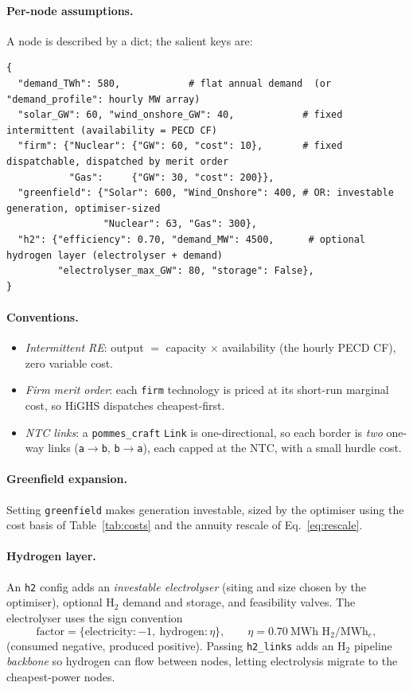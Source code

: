 \documentclass[11pt,a4paper]{article}
\begin{document}
\paragraph{Per-node assumptions.} A node is described by a dict; the salient keys are:
\begin{lstlisting}
{
  "demand_TWh": 580,            # flat annual demand  (or "demand_profile": hourly MW array)
  "solar_GW": 60, "wind_onshore_GW": 40,            # fixed intermittent (availability = PECD CF)
  "firm": {"Nuclear": {"GW": 60, "cost": 10},       # fixed dispatchable, dispatched by merit order
           "Gas":     {"GW": 30, "cost": 200}},
  "greenfield": {"Solar": 600, "Wind_Onshore": 400, # OR: investable generation, optimiser-sized
                 "Nuclear": 63, "Gas": 300},
  "h2": {"efficiency": 0.70, "demand_MW": 4500,      # optional hydrogen layer (electrolyser + demand)
         "electrolyser_max_GW": 80, "storage": False},
}
\end{lstlisting}

\paragraph{Conventions.}
\begin{itemize}[nosep]
  \item \emph{Intermittent RE}: output $=$ capacity $\times$ availability (the hourly PECD CF), zero
        variable cost.
  \item \emph{Firm merit order}: each \texttt{firm} technology is priced at its short-run marginal cost,
        so HiGHS dispatches cheapest-first.
  \item \emph{NTC links}: a \texttt{pommes\_craft} \texttt{Link} is one-directional, so each border is
        \emph{two} one-way links (\texttt{a$\to$b}, \texttt{b$\to$a}), each capped at the NTC, with a
        small hurdle cost.
\end{itemize}

\paragraph{Greenfield expansion.} Setting \texttt{greenfield} makes generation investable, sized by the
optimiser using the cost basis of Table~\ref{tab:costs} and the annuity rescale of
Eq.~\eqref{eq:rescale}.

\paragraph{Hydrogen layer.} An \texttt{h2} config adds an \emph{investable electrolyser} (siting and
size chosen by the optimiser), optional H$_2$ demand and storage, and feasibility valves. The
electrolyser uses the sign convention
\begin{equation}
\text{factor} = \{\text{electricity}: -1,\ \text{hydrogen}: \eta\}, \qquad \eta = 0.70\ \text{MWh H}_2/\text{MWh}_e,
\end{equation}
(consumed negative, produced positive). Passing \texttt{h2\_links} adds an H$_2$ pipeline
\emph{backbone} so hydrogen can flow between nodes, letting electrolysis migrate to the
cheapest-power nodes.
\end{document}
